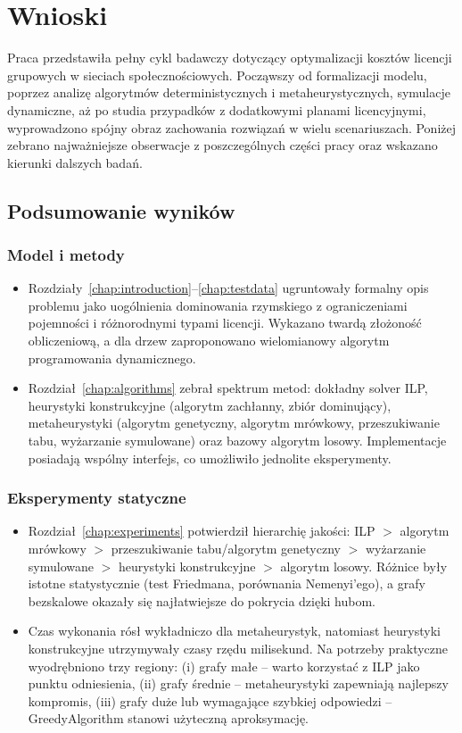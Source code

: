 \chapter{Wnioski}\label{chap:conclusion}

Praca przedstawiła pełny cykl badawczy dotyczący optymalizacji kosztów licencji grupowych w sieciach społecznościowych. Począwszy od formalizacji modelu, poprzez analizę algorytmów deterministycznych i metaheurystycznych, symulacje dynamiczne, aż po studia przypadków z dodatkowymi planami licencyjnymi, wyprowadzono spójny obraz zachowania rozwiązań w wielu scenariuszach. Poniżej zebrano najważniejsze obserwacje z poszczególnych części pracy oraz wskazano kierunki dalszych badań.

\section{Podsumowanie wyników}

\subsection*{Model i metody}
\begin{itemize}
  \item Rozdziały~\ref{chap:introduction}--\ref{chap:testdata} ugruntowały formalny opis problemu jako uogólnienia dominowania rzymskiego z ograniczeniami pojemności i różnorodnymi typami licencji. Wykazano twardą złożoność obliczeniową, a dla drzew zaproponowano wielomianowy algorytm programowania dynamicznego.
  \item Rozdział~\ref{chap:algorithms} zebrał spektrum metod: dokładny solver ILP, heurystyki konstrukcyjne (algorytm zachłanny, zbiór dominujący), metaheurystyki (algorytm genetyczny, algorytm mrówkowy, przeszukiwanie tabu, wyżarzanie symulowane) oraz bazowy algorytm losowy. Implementacje posiadają wspólny interfejs, co umożliwiło jednolite eksperymenty.
\end{itemize}

\subsection*{Eksperymenty statyczne}
\begin{itemize}
  \item Rozdział~\ref{chap:experiments} potwierdził hierarchię jakości: ILP $>$ algorytm mrówkowy $>$ przeszukiwanie tabu/algorytm genetyczny $>$ wyżarzanie symulowane $>$ heurystyki konstrukcyjne $>$ algorytm losowy. Różnice były istotne statystycznie (test Friedmana, porównania Nemenyi'ego), a grafy bezskalowe okazały się najłatwiejsze do pokrycia dzięki hubom.
  \item Czas wykonania rósł wykładniczo dla metaheurystyk, natomiast heurystyki konstrukcyjne utrzymywały czasy rzędu milisekund. Na potrzeby praktyczne wyodrębniono trzy regiony: (i) grafy małe -- warto korzystać z ILP jako punktu odniesienia, (ii) grafy średnie -- metaheurystyki zapewniają najlepszy kompromis, (iii) grafy duże lub wymagające szybkiej odpowiedzi -- GreedyAlgorithm stanowi użyteczną aproksymację.
\end{itemize}

